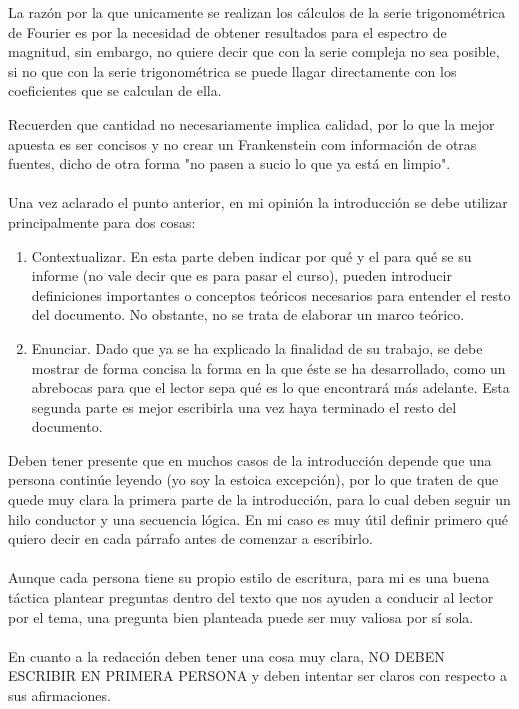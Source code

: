 \documentclass[12pt]{article}
\begin{document}
    La razón por la que unicamente se realizan los cálculos de la serie trigonométrica de 
    Fourier es por la necesidad de obtener resultados para el espectro de magnitud, sin 
    embargo, no quiere decir que con la serie compleja no sea posible, si no que con la serie 
    trigonométrica se puede llagar directamente con los coeficientes que se calculan de ella.

    Recuerden que cantidad no necesariamente implica calidad, por lo que la mejor apuesta 
    es ser concisos y no crear un Frankenstein com información de otras fuentes, dicho de 
    otra forma "no pasen a sucio lo que ya está en limpio".\\
    \\
    Una vez aclarado el punto anterior, en mi opinión la introducción se debe utilizar 
    principalmente para dos cosas:
    \begin{enumerate}
        \item Contextualizar. En esta parte deben indicar por qué y el para qué se su informe 
        (no vale decir que es para pasar el curso), pueden introducir definiciones 
        importantes o conceptos teóricos necesarios para entender el resto del 
        documento. No obstante, no se trata de elaborar un marco teórico.

        \item Enunciar. Dado que ya se ha explicado la finalidad de su trabajo, se debe mostrar 
        de forma concisa la forma en la que éste se ha desarrollado, como un abrebocas 
        para que el lector sepa qué es lo que encontrará más adelante. Esta segunda 
        parte es mejor escribirla una vez haya terminado el resto del documento.
    \end{enumerate}
    Deben tener presente que en muchos casos de la introducción depende que una persona 
    continúe leyendo (yo soy la estoica excepción), por lo que traten de que quede muy clara la 
    primera parte de la introducción, para lo cual deben seguir un hilo conductor y una 
    secuencia lógica. En mi caso es muy útil definir primero qué quiero decir en cada párrafo 
    antes de comenzar a escribirlo.\\
    \\
    Aunque cada persona tiene su propio estilo de escritura, para mi es una buena táctica 
    plantear preguntas dentro del texto que nos ayuden a conducir al lector por el tema, una 
    pregunta bien planteada puede ser muy valiosa por sí sola.\\
    \\
    En cuanto a la redacción deben tener una cosa muy clara, NO DEBEN ESCRIBIR EN 
    PRIMERA PERSONA y deben intentar ser claros con respecto a sus afirmaciones.
    
\end{document}
